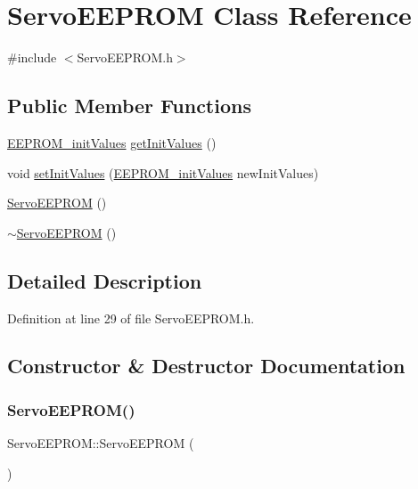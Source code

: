 \hypertarget{class_servo_e_e_p_r_o_m}{}\section{Servo\+E\+E\+P\+R\+OM Class Reference}
\label{class_servo_e_e_p_r_o_m}


{\ttfamily \#include $<$Servo\+E\+E\+P\+R\+O\+M.\+h$>$}

\subsection*{Public Member Functions}
\begin{DoxyCompactItemize}
\item 
\hyperlink{struct_e_e_p_r_o_m__init_values}{E\+E\+P\+R\+O\+M\+\_\+init\+Values} \hyperlink{class_servo_e_e_p_r_o_m_ac6e03a1694107eed257a171e01d37029}{get\+Init\+Values} ()
\item 
void \hyperlink{class_servo_e_e_p_r_o_m_a0051b754f421b6bf445382e451e49c46}{set\+Init\+Values} (\hyperlink{struct_e_e_p_r_o_m__init_values}{E\+E\+P\+R\+O\+M\+\_\+init\+Values} new\+Init\+Values)
\item 
\hyperlink{class_servo_e_e_p_r_o_m_a966a3f74229625825f68dacf65592897}{Servo\+E\+E\+P\+R\+OM} ()
\item 
\hyperlink{class_servo_e_e_p_r_o_m_a5cecb1d16d1dbd8cf1530a808288451d}{$\sim$\+Servo\+E\+E\+P\+R\+OM} ()
\end{DoxyCompactItemize}


\subsection{Detailed Description}


Definition at line 29 of file Servo\+E\+E\+P\+R\+O\+M.\+h.



\subsection{Constructor \& Destructor Documentation}
\mbox{\label{class_servo_e_e_p_r_o_m_a966a3f74229625825f68dacf65592897}} 
\subsubsection{\texorpdfstring{Servo\+E\+E\+P\+R\+O\+M()}{ServoEEPROM()}}
{\footnotesize\ttfamily Servo\+E\+E\+P\+R\+O\+M\+::\+Servo\+E\+E\+P\+R\+OM (\begin{DoxyParamCaption}{ }\end{DoxyParamCaption})}



